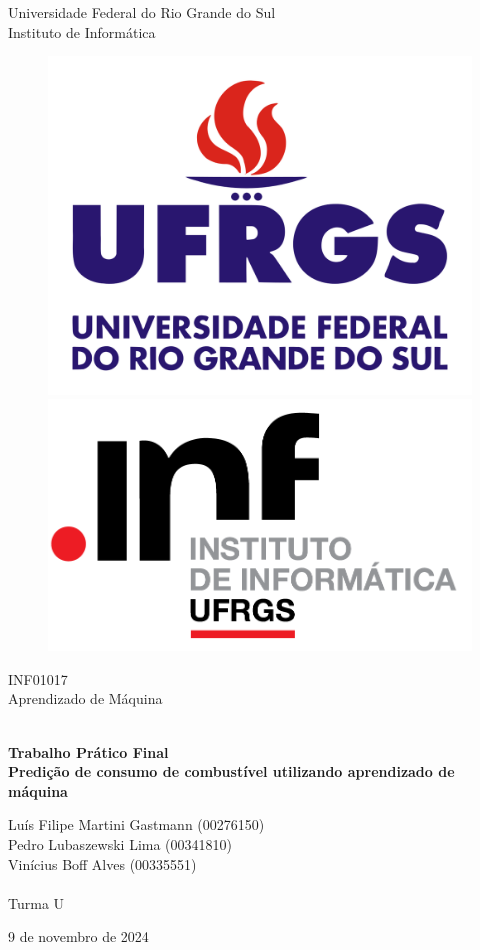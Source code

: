 \documentclass{report}
\begin{document}
    \begin{titlepage}
        \centering
        
        \LARGE {Universidade Federal do Rio Grande do Sul \\ Instituto de Informática}
    
        \begin{figure}[h!]
        \centering
        \subfigure
        {\includegraphics[width=0.35\linewidth]{images/logos/UFRGS.png}}
        \hspace{1cm}
        \subfigure
        {\includegraphics[width=0.35\linewidth]{images/logos/INF.png}}
        \end{figure}
    
        \LARGE {INF01017 \\ Aprendizado de Máquina}
        
        \vfill
        {\noindent\hrulefill \\
        \bfseries \Huge{Trabalho Prático Final} \\ \LARGE{Predição de consumo de combustível utilizando aprendizado de máquina} \\
        \noindent\hrulefill}
        
        \vfill
        {\LARGE Luís Filipe Martini Gastmann (00276150) \\ Pedro Lubaszewski Lima (00341810) \\ Vinícius Boff Alves (00335551) \\~\\ Turma U}
    
        \vfill
        {\LARGE 9 de novembro de 2024}
        
    \end{titlepage}

        \renewcommand{\contentsname}{Sumário}
        \tableofcontents
        \clearpage
\end{document}
